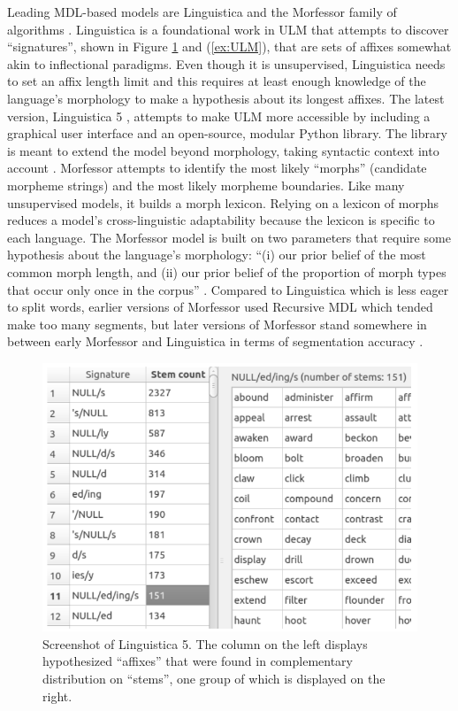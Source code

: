 \documentclass[12pt]{article}
\begin{document}
Leading MDL-based models are Linguistica \cite{goldsmith_linguistica:_2000,goldsmith_unsupervised_2001} and the Morfessor family of algorithms \cite{creutz_unsupervised_2005a,creutz_unsupervised_2007}. Linguistica is a foundational work in ULM that attempts to discover “signatures”, shown in Figure \ref{fig:signatures} and (\ref{ex:ULM}), that are sets of affixes somewhat akin to inflectional paradigms. Even though it is unsupervised, Linguistica needs to set an affix length limit and this requires at least enough knowledge of the language’s morphology to make a hypothesis about its longest affixes. The latest version, Linguistica 5 \cite{lee_linguistica_2016}, attempts to make ULM more accessible by including a graphical user interface and an open-source, modular Python library. The library is meant to extend the model beyond morphology, taking syntactic context into account \cite{nicolai_morphological_2017}. Morfessor \cite{creutz_unsupervised_2005a,creutz_inducing_2005b,creutz_unsupervised_2007} attempts to identify the most likely ``morphs'' (candidate morpheme strings) and the most likely morpheme boundaries. Like many unsupervised models, it builds a morph lexicon. Relying on a lexicon of morphs reduces a model's cross-linguistic adaptability because the lexicon is specific to each language. The Morfessor model is built on two parameters that require some hypothesis about the language's morphology: ``(i) our prior belief of the most common morph length, and (ii) our prior belief of the proportion of morph types that occur only once in the corpus'' \cite[p. 281]{creutz_unsupervised_2003}. Compared to Linguistica which is less eager to split words, earlier versions of Morfessor used Recursive MDL which tended make too many segments, but later versions of Morfessor stand somewhere in between early Morfessor and Linguistica in terms of segmentation accuracy \cite{creutz_unsupervised_2003}. 

\begin{figure}[t]
\begin{center}
\includegraphics[width=0.5\columnwidth]{Linguistica5-signatures.PNG}
\caption{Screenshot of Linguistica 5. The column on the left displays hypothesized ``affixes'' that were found in complementary distribution on ``stems'', one group of which is displayed on the right.}
\label{fig:signatures}
\end{center}
\end{figure}
\end{document}
